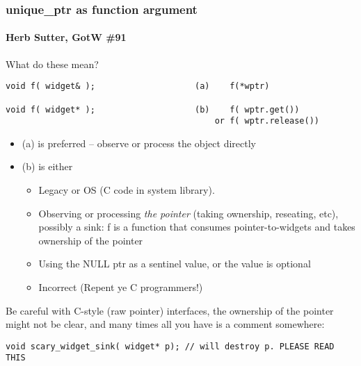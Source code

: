 \begin{frame}[fragile]
\frametitle{unique\_ptr as function argument}
\framesubtitle{Herb Sutter, GotW \#91}
What do these mean?
{\scriptsize\begin{verbatim}
void f( widget& );                    (a)    f(*wptr)

void f( widget* );                    (b)    f( wptr.get())
                                          or f( wptr.release())
\end{verbatim}}
\begin{itemize}
\pause{}
\item (a) is preferred -- observe or process the object directly
\pause{}
\item (b) is either
\begin{itemize}
  \item Legacy or OS (C code in system library).
  \item Observing or processing \emph{the pointer} (taking ownership,
    reseating, etc), possibly a sink: f is a function that consumes
    pointer-to-widgets and takes ownership of the pointer
  \item Using the NULL ptr as a sentinel value, or the value is optional
  \item Incorrect (Repent ye C programmers!)
\end{itemize}
\end{itemize}
Be careful with C-style (raw pointer) interfaces, the ownership of the
pointer might not be clear, and many times all you have is a comment somewhere:
{\scriptsize\begin{verbatim}
void scary_widget_sink( widget* p); // will destroy p. PLEASE READ THIS
\end{verbatim}}
\end{frame}




